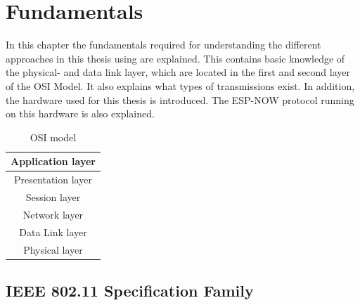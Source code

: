 \chapter{Fundamentals}
\label{sec:fundamentals}


In this chapter the fundamentals required for understanding the different approaches 
in this thesis using are explained.
This contains basic knowledge of the physical- and data link layer,
which are located in the first and second layer of the \ac{OSI} Model.
It also explains what types of transmissions exist.
In addition, the hardware used for this thesis is introduced.
The ESP-NOW protocol running on this hardware is also explained.

\begin{table}[h]
	\centering
	\begin{tabular}{ |c| } 
		\hline
		Application layer\\
		\hline
		Presentation layer\\
		\hline
		Session layer\\
		\hline
		Network layer\\
		\hline
		\cellcolor{yellow!25}Data Link layer\\
		\hline
		\cellcolor{yellow!25}Physical layer\\
		\hline
	\end{tabular}
	\caption{\ac{OSI} model}
	\label{tab:OSI}
\end{table}

\section{IEEE 802.11 Specification Family}

